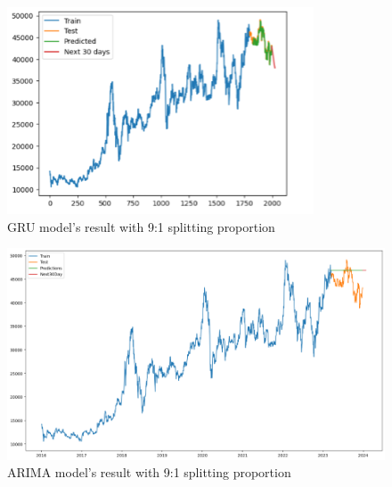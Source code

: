 \documentclass{ieeeojies}
\begin{document}
\begin{figure}[H]
  \centering
  \begin{minipage}{0.8\linewidth}
    \centering
    \includegraphics[width=\linewidth]{bibliography/GRU_BIDV91.png}
    \caption{GRU model's result with 9:1 splitting proportion}
    \label{fig24}
  \end{minipage}
\end{figure}
\begin{figure}[H]
  \centering
  \begin{minipage}{0.8\linewidth}
    \centering
    \includegraphics[width=\linewidth]{bibliography/ARIMA_BIDV91.png}
    \caption{ARIMA model's result with 9:1 splitting proportion}
    \label{fig25}
  \end{minipage}
\end{figure}
\end{document}
